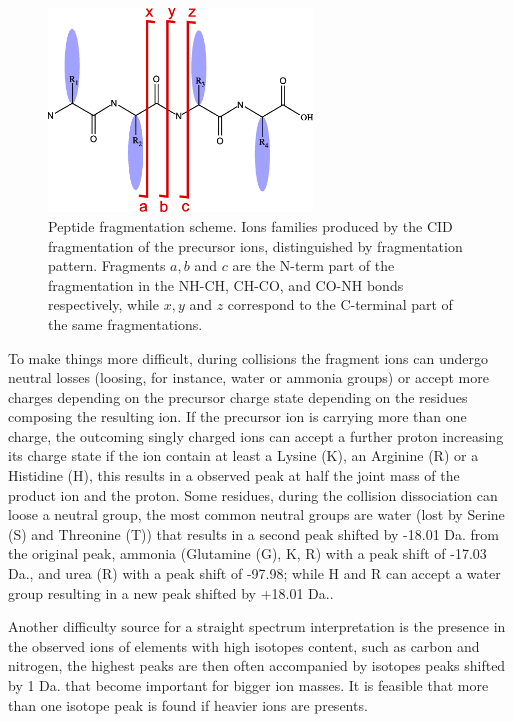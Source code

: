 \begin{figure}
\centering
\includegraphics[width=7cm]{./img/msms/amino-cleavage.eps}
\caption{\label{fig:frag}Peptide fragmentation scheme. Ions families
produced by the CID fragmentation of the precursor ions, distinguished by
fragmentation pattern.
Fragments $a,b$ and $c$ are the N-term part of the fragmentation in the NH-CH,
CH-CO, and CO-NH bonds respectively, while $x,y$ and $z$ correspond to the
C-terminal part of the same fragmentations. }
\end{figure}


To make things more difficult, during collisions the fragment ions can undergo
neutral losses (loosing, for instance, water or ammonia groups) or accept more charges
depending on the precursor charge state depending on the residues composing the
resulting ion.
If the precursor ion is carrying more than one charge, the outcoming singly
charged ions can accept a further proton increasing its charge state if the ion
contain at least a Lysine (K), an Arginine (R) or a Histidine (H), this results
in a observed peak at half the joint mass of the product ion and the proton.
Some residues, during the collision dissociation can loose a neutral group,
the most common neutral groups are water (lost by Serine (S) and Threonine (T))
that results in a second peak shifted by -18.01 Da. from the original peak,
ammonia (Glutamine (G), K, R) with a peak shift of -17.03 Da., and urea (R) with
a peak shift of -97.98; while H and R can accept a water group resulting in a
new peak shifted by +18.01 Da..

Another difficulty source for a straight spectrum interpretation is the presence
in the observed ions of elements with high isotopes content, such as carbon and
nitrogen, the highest peaks are then often accompanied by isotopes peaks shifted
by 1 Da. that become important for bigger ion masses. It is feasible that more
than one isotope peak is found if heavier ions are presents.


